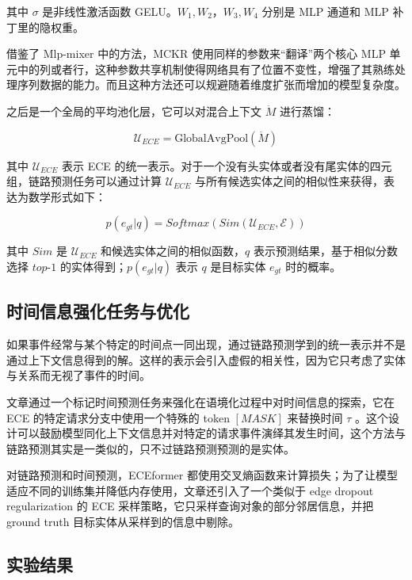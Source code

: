 \documentclass[a4paper, AutoFakeBold]{article}
\begin{document}
其中 $\sigma$ 是非线性激活函数 GELU。$W_1,W_2$，$W_3,W_4$ 分别是 MLP 通道和 MLP 补丁里的隐权重。

借鉴了 Mlp-mixer 中的方法，MCKR 使用同样的参数来“翻译”两个核心 MLP 单元中的列或者行，这种参数共享机制使得网络具有了位置不变性，增强了其熟练处理序列数据的能力。而且这种方法还可以规避随着维度扩张而增加的模型复杂度。

之后是一个全局的平均池化层，它可以对混合上下文 $\ddot{M}$ 进行蒸馏：

\begin{equation}
{\mathcal U}_{ECE}=\text{GlobalAvgPool}(\ddot{M})
\end{equation}

其中 ${\mathcal U}_{ECE}$ 表示 ECE 的统一表示。对于一个没有头实体或者没有尾实体的四元组，链路预测任务可以通过计算 ${\mathcal U}_{ECE}$ 与所有候选实体之间的相似性来获得，表达为数学形式如下：

\begin{equation}
p(e_{gt}|q)=Softmax(Sim(\mathcal{U}_{ECE},\mathcal{E}))
\end{equation}

其中 $Sim$ 是 $\mathcal{U}_{ECE}$ 和候选实体之间的相似函数，$q$ 表示预测结果，基于相似分数选择 $top\text{-}1$ 的实体得到；$p(e_{gt}|q)$ 表示 $q$ 是目标实体 $e_{gt}$ 时的概率。


\subsection{时间信息强化任务与优化}

如果事件经常与某个特定的时间点一同出现，通过链路预测学到的统一表示并不是通过上下文信息得到的解。这样的表示会引入虚假的相关性，因为它只考虑了实体与关系而无视了事件的时间。

文章通过一个标记时间预测任务来强化在语境化过程中对时间信息的探索，它在 ECE 的特定请求分支中使用一个特殊的 token $[MASK]$ 来替换时间 $\tau$ 。这个设计可以鼓励模型同化上下文信息并对特定的请求事件演绎其发生时间，这个方法与链路预测其实是一类似的，只不过链路预测预测的是实体。

对链路预测和时间预测，ECEformer 都使用交叉熵函数来计算损失；为了让模型适应不同的训练集并降低内存使用，文章还引入了一个类似于 edge dropout regularization 的 ECE 采样策略，它只采样查询对象的部分邻居信息，并把 ground truth 目标实体从采样到的信息中剔除。


\subsection{实验结果}
\end{document}
